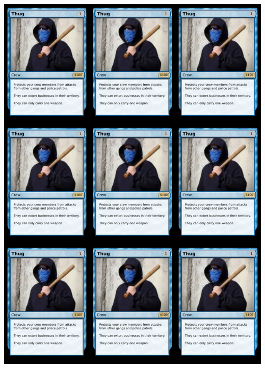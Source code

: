 \documentclass[a4paper]{article}
\begin{document}
\begin{center}
	\centering
	\includegraphics[width=190.5mm,height=266.7mm]{output/images/front.png}
\end{center}
\end{document}
